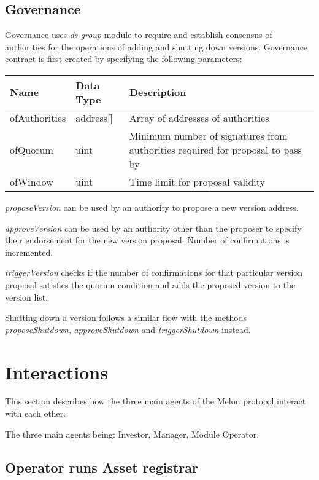 \documentclass[conference]{IEEEtran}
\begin{document}
\subsection{Governance} \label{component:governance}

Governance uses \textit{ds-group} module to require and establish consensus of authorities for the operations of adding and shutting down versions. Governance contract is first created by specifying the following parameters:

\begin{center}
	\footnotesize
	\begin{tabular}{ | p{2cm} | p{1.2cm} | p{4cm} | }
		\hline
		Name & Data Type & Description \\ \hline
		ofAuthorities & address[] & Array of addresses of authorities \\ \hline
		ofQuorum & uint & Minimum number of signatures from authorities required for proposal to pass by \\ \hline
		ofWindow & uint & Time limit for proposal validity \\ \hline
	\end{tabular}
\end{center}


\textit{proposeVersion} can be used by an authority to propose a new version address.

\textit{approveVersion} can be used by an authority other than the proposer to specify their endorsement for the new version proposal.  Number of confirmations is incremented.

\textit{triggerVersion} checks if the number of confirmations for that particular version proposal satisfies the quorum condition and adds the proposed version to the version list. 

Shutting down a version follows a similar flow with the methods \textit{proposeShutdown}, \textit{approveShutdown} and \textit{triggerShutdown} instead.

\section{Interactions}

This section describes how the three main agents of the Melon protocol interact with each other.

The three main agents being: Investor, Manager, Module Operator.

\subsection{Operator runs Asset registrar}
\end{document}
